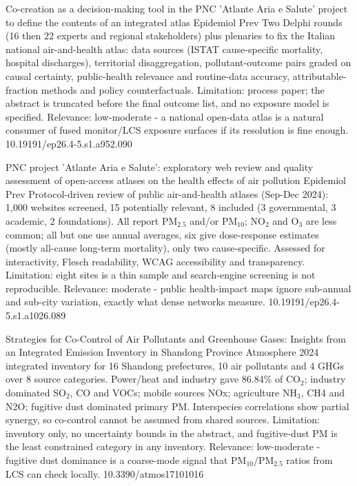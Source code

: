\documentclass[10pt]{article}
\begin{document}
{Co-creation as a decision-making tool in the PNC 'Atlante Aria e Salute' project to define the contents of an integrated atlas}
{Epidemiol Prev}
{Two Delphi rounds (16 then 22 experts and regional stakeholders) plus plenaries to fix the Italian national air-and-health atlas: data sources (ISTAT cause-specific mortality, hospital discharges), territorial disaggregation, pollutant-outcome pairs graded on causal certainty, public-health relevance and routine-data accuracy, attributable-fraction methods and policy counterfactuals. Limitation: process paper; the abstract is truncated before the final outcome list, and no exposure model is specified. Relevance: low-moderate - a national open-data atlas is a natural consumer of fused monitor/LCS exposure surfaces if its resolution is fine enough.}
{10.19191/ep26.4-5.s1.a952.090}

{PNC project 'Atlante Aria e Salute': exploratory web review and quality assessment of open-access atlases on the health effects of air pollution}
{Epidemiol Prev}
{Protocol-driven review of public air-and-health atlases (Sep-Dec 2024): 1,000 websites screened, 15 potentially relevant, 8 included (3 governmental, 3 academic, 2 foundations). All report PM$_{2.5}$ and/or PM$_{10}$; NO$_2$ and O$_3$ are less common; all but one use annual averages, six give dose-response estimates (mostly all-cause long-term mortality), only two cause-specific. Assessed for interactivity, Flesch readability, WCAG accessibility and transparency. Limitation: eight sites is a thin sample and search-engine screening is not reproducible. Relevance: moderate - public health-impact maps ignore sub-annual and sub-city variation, exactly what dense networks measure.}
{10.19191/ep26.4-5.s1.a1026.089}

{Strategies for Co-Control of Air Pollutants and Greenhouse Gases: Insights from an Integrated Emission Inventory in Shandong Province}
{Atmosphere}
{2024 integrated inventory for 16 Shandong prefectures, 10 air pollutants and 4 GHGs over 8 source categories. Power/heat and industry gave 86.84\% of CO$_2$; industry dominated SO$_2$, CO and VOCs; mobile sources NOx; agriculture NH$_3$, CH4 and N2O; fugitive dust dominated primary PM. Interspecies correlations show partial synergy, so co-control cannot be assumed from shared sources. Limitation: inventory only, no uncertainty bounds in the abstract, and fugitive-dust PM is the least constrained category in any inventory. Relevance: low-moderate - fugitive dust dominance is a coarse-mode signal that PM$_{10}$/PM$_{2.5}$ ratios from LCS can check locally.}
{10.3390/atmos17101016}
\end{document}
